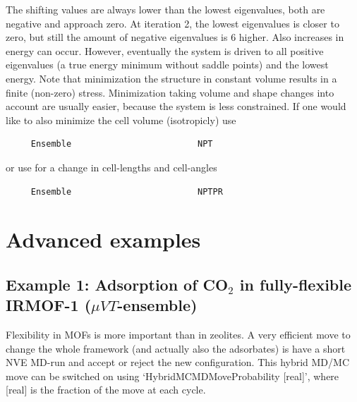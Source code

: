 The shifting values are always lower than the lowest eigenvalues, both are negative and approach zero. At iteration 2, the lowest eigenvalues is closer
to zero, but still the amount of negative eigenvalues is 6 higher. Also increases in energy can occur. However, eventually the system is driven to
all positive eigenvalues (a true energy minimum without saddle points) and the lowest energy.
Note that minimization the structure in constant volume results in a finite (non-zero) stress. Minimization taking volume and shape changes into account
are usually easier, because the system is less constrained.
If one would like to also minimize the cell volume (isotropicly) use
\begin{tiny}
\begin{verbatim}
     Ensemble                         NPT
\end{verbatim}
\end{tiny}
or use for a change in cell-lengths and cell-angles
\begin{tiny}
\begin{verbatim}
     Ensemble                         NPTPR
\end{verbatim}
\end{tiny}


\section{Advanced examples}

\subsection*{Example 1: Adsorption of CO$_2$ in fully-flexible IRMOF-1 ($\mu VT$-ensemble)}

Flexibility in MOFs is more important than in zeolites. A very efficient move to change the whole framework (and actually
also the adsorbates) is have a short NVE MD-run and accept or reject the new configuration. This hybrid MD/MC move can be switched on using
`HybridMCMDMoveProbability  [real]', where [real] is the fraction of the move at each cycle.

